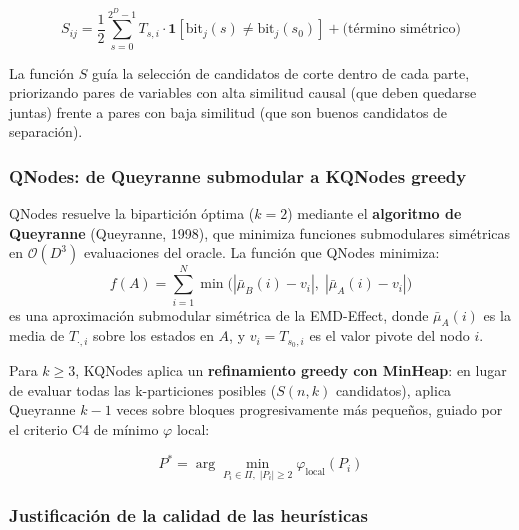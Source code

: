 \begin{equation}
  S_{ij} = \frac{1}{2}\sum_{s=0}^{2^D-1} T_{s,i} \cdot \mathbf{1}\!\left[
    \text{bit}_j(s) \neq \text{bit}_j(s_0)
  \right]
  + \text{(término simétrico)}
  \label{eq:S_matrix}
\end{equation}

La función $S$ guía la selección de candidatos de corte dentro de cada parte, priorizando
pares de variables con alta similitud causal (que deben quedarse juntas) frente a pares con
baja similitud (que son buenos candidatos de separación).

\subsubsection*{QNodes: de Queyranne submodular a KQNodes greedy}

QNodes resuelve la bipartición óptima ($k=2$) mediante el \textbf{algoritmo de Queyranne}
(Queyranne, 1998), que minimiza funciones submodulares simétricas en $\mathcal{O}(D^3)$
evaluaciones del oracle. La función que QNodes minimiza:
\begin{equation}
  f(A) = \sum_{i=1}^{N} \min\bigl(
    |\bar{\mu}_B(i) - v_i|,\;
    |\bar{\mu}_A(i) - v_i|
  \bigr)
  \label{eq:f_oracle}
\end{equation}
es una aproximación submodular simétrica de la EMD-Effect, donde $\bar{\mu}_A(i)$ es la media
de $T_{\cdot,i}$ sobre los estados en $A$, y $v_i = T_{s_0,i}$ es el valor pivote del nodo $i$.

Para $k \geq 3$, KQNodes aplica un \textbf{refinamiento greedy con MinHeap}: en lugar de
evaluar todas las k-particiones posibles ($S(n,k)$ candidatos), aplica Queyranne $k-1$ veces
sobre bloques progresivamente más pequeños, guiado por el criterio C4 de mínimo $\varphi$
local:

\begin{equation}
  P^* = \arg\min_{P_i \in \Pi,\; |P_i| \geq 2} \varphi_{\text{local}}(P_i)
  \label{eq:criterio_c4}
\end{equation}

\subsubsection*{Justificación de la calidad de las heurísticas}

